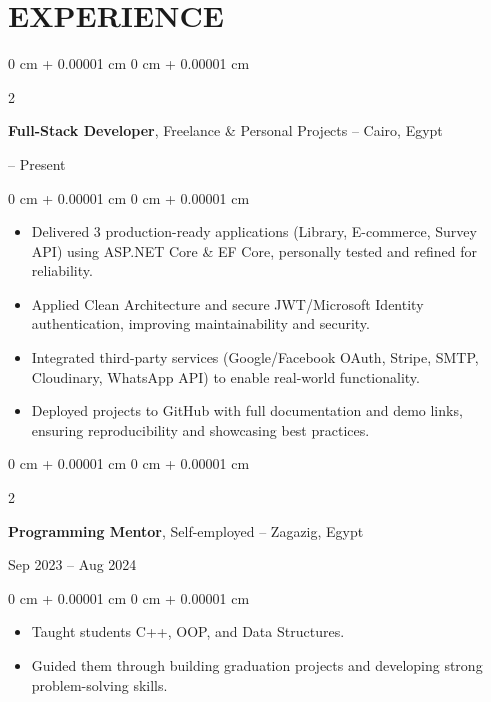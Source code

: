 \documentclass[10pt, letterpaper]{article}
\newenvironment{highlights}{
    \begin{itemize}[
        topsep=0.10 cm,
        parsep=0.10 cm,
        partopsep=0pt,
        itemsep=0pt,
        leftmargin=0 cm + 10pt
    ]
}{
    \end{itemize}
} %
\newenvironment{onecolentry}{
    \begin{adjustwidth}{
        0 cm + 0.00001 cm
    }{
        0 cm + 0.00001 cm
    }
}{
    \end{adjustwidth}
} %
\newenvironment{twocolentry}[2][]{
    \onecolentry
    \def\secondColumn{#2}
    \setcolumnwidth{\fill, 4.5 cm}
    \begin{paracol}{2}
}{
    \switchcolumn \raggedleft \secondColumn
    \end{paracol}
    \endonecolentry
} %
\begin{document}
    \section{EXPERIENCE}
    
    \begin{twocolentry}{2024 -- Present}
        \textbf{Full-Stack Developer}, Freelance \& Personal Projects -- Cairo, Egypt
    \end{twocolentry}
    
    \vspace{0.10 cm}
    \begin{onecolentry}
        \begin{highlights}
            \item Delivered 3 production-ready applications (Library, E-commerce, Survey API) using ASP.NET Core \& EF Core, personally tested and refined for reliability.
            \item Applied Clean Architecture and secure JWT/Microsoft Identity authentication, improving maintainability and security.
            \item Integrated third-party services (Google/Facebook OAuth, Stripe, SMTP, Cloudinary, WhatsApp API) to enable real-world functionality.
            \item Deployed projects to GitHub with full documentation and demo links, ensuring reproducibility and showcasing best practices.
        \end{highlights}
    \end{onecolentry}
    
    \vspace{0.2 cm}
    
    \begin{twocolentry}{Sep 2023 -- Aug 2024}
        \textbf{Programming Mentor}, Self-employed -- Zagazig, Egypt
    \end{twocolentry}
    
    \vspace{0.10 cm}
    \begin{onecolentry}
        \begin{highlights}
            \item Taught students C++, OOP, and Data Structures.
            \item Guided them through building graduation projects and developing strong problem-solving skills.
        \end{highlights}
    \end{onecolentry}
    
\end{document}

